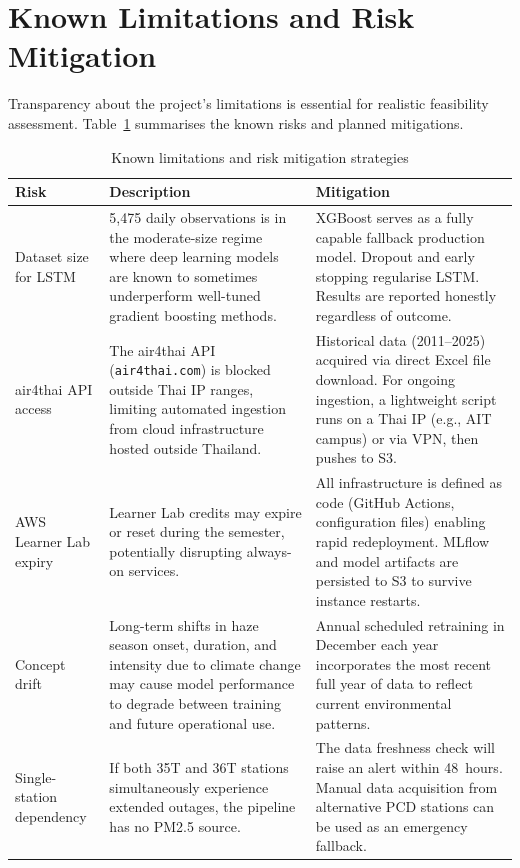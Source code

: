 \documentclass[12pt,a4paper]{report}
\begin{document}
\section{Known Limitations and Risk Mitigation}

Transparency about the project's limitations is essential for realistic feasibility assessment. Table~\ref{tab:risks} summarises the known risks and planned mitigations.

\begin{table}[H]
\centering
\caption{Known limitations and risk mitigation strategies}
\label{tab:risks}
\begin{tabularx}{\textwidth}{@{}lXX@{}}
\toprule
\textbf{Risk} & \textbf{Description} & \textbf{Mitigation} \\
\midrule
Dataset size for LSTM &
  5,475 daily observations is in the moderate-size regime where deep learning models are known to sometimes underperform well-tuned gradient boosting methods. &
  XGBoost serves as a fully capable fallback production model. Dropout and early stopping regularise LSTM. Results are reported honestly regardless of outcome. \\[6pt]

air4thai API access &
  The air4thai API (\texttt{air4thai.com}) is blocked outside Thai IP ranges, limiting automated ingestion from cloud infrastructure hosted outside Thailand. &
  Historical data (2011--2025) acquired via direct Excel file download. For ongoing ingestion, a lightweight script runs on a Thai IP (e.g., AIT campus) or via VPN, then pushes to S3. \\[6pt]

AWS Learner Lab expiry &
  Learner Lab credits may expire or reset during the semester, potentially disrupting always-on services. &
  All infrastructure is defined as code (GitHub Actions, configuration files) enabling rapid redeployment. MLflow and model artifacts are persisted to S3 to survive instance restarts. \\[6pt]

Concept drift &
  Long-term shifts in haze season onset, duration, and intensity due to climate change may cause model performance to degrade between training and future operational use. &
  Annual scheduled retraining in December each year incorporates the most recent full year of data to reflect current environmental patterns. \\[6pt]

Single-station dependency &
  If both 35T and 36T stations simultaneously experience extended outages, the pipeline has no PM2.5 source. &
  The data freshness check will raise an alert within 48~hours. Manual data acquisition from alternative PCD stations can be used as an emergency fallback. \\
\bottomrule
\end{tabularx}
\end{table}
\end{document}
